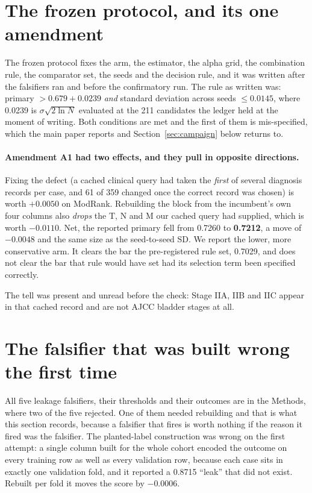 \documentclass[11pt]{article}
\begin{document}
\section{The frozen protocol, and its one amendment}
The frozen protocol fixes the arm, the estimator, the alpha
grid, the combination rule, the comparator set, the seeds and the decision rule, and it was written
after the falsifiers ran and before the confirmatory run. The rule as written was: primary
$> 0.679 + 0.0239$ \emph{and} standard deviation across seeds $\leq 0.0145$, where 0.0239 is
$\sigma\sqrt{2\ln N}$ evaluated at the 211 candidates the ledger held at the moment of writing.
Both conditions are met and the first of them is mis-specified, which the main paper reports and
Section~\ref{sec:campaign} below returns to.

\paragraph{Amendment A1 had two effects, and they pull in opposite directions.} Fixing the defect (a cached clinical query had taken the \emph{first} of several diagnosis records per case, and 61 of 359 changed once the correct record was chosen) is worth $+0.0050$ on ModRank. Rebuilding
the block from the incumbent's own four columns also \emph{drops} the T, N and M our cached query
had supplied, which is worth $-0.0110$. Net, the reported primary fell from 0.7260 to
\textbf{0.7212}, a move of $-0.0048$ and the same size as the seed-to-seed SD. We report the lower,
more conservative arm. It clears the bar the pre-registered rule set, 0.7029, and does not clear
the bar that rule would have set had its selection term been specified correctly.

The tell was present and unread before the check: Stage IIA, IIB and IIC appear in that cached
record and are not AJCC bladder stages at all.

\section{The falsifier that was built wrong the first time}
All five leakage falsifiers, their thresholds and their outcomes are in the Methods, where two of
the five rejected. One of them needed rebuilding and that is what this section records, because a
falsifier that fires is worth nothing if the reason it fired was the falsifier. The planted-label
construction was wrong on the first attempt: a single column built for the whole cohort encoded the outcome on every training row as
well as every validation row, because each case sits in exactly one validation fold, and it
reported a 0.8715 ``leak'' that did not exist. Rebuilt per fold it moves the score by $-0.0006$.
\end{document}
